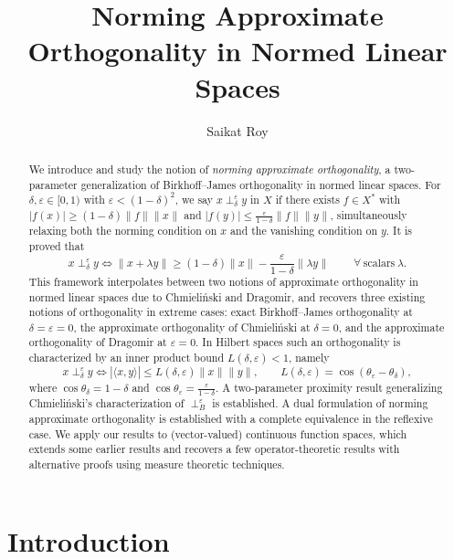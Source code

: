 \documentclass[11pt, reqno]{amsart}
\title[Norming Approximate Orthogonality]
{Norming Approximate Orthogonality in Normed Linear Spaces}
\author{Saikat Roy}
\theoremstyle{definition}
\newcommand{\nperp}{\perp_{\delta}^\varepsilon}
\begin{document}
\begin{abstract}
We introduce and study the notion of \emph{norming approximate orthogonality}, a two-parameter generalization of Birkhoff--James orthogonality in normed linear spaces. For 
$\delta, \varepsilon \in [0,1)$ with $\varepsilon < (1-\delta)^2$, we say 
$x \nperp y$ in $X$ if there exists $f \in X^*$ with 
$|f(x)| \geq (1-\delta)\|f\|\|x\|$ and $|f(y)| \leq \frac{\varepsilon}{1-\delta}\|f\|\|y\|$, 
simultaneously relaxing both the norming condition on $x$ and the vanishing 
condition on $y$. It is proved that
\[
x\nperp y \iff \|x+\lambda y\|\geq (1-\delta)\|x\|-\frac{\varepsilon}{1-\delta}\|\lambda y\|~\qquad \forall ~\text{scalars}~\lambda.
\]
This framework interpolates between two notions of approximate orthogonality in normed linear spaces due to Chmieli\'nski and Dragomir, and recovers three existing notions of orthogonality in extreme cases: exact Birkhoff--James orthogonality at $\delta = \varepsilon = 0$, the approximate 
orthogonality of Chmieli\'nski at $\delta = 0$, and the approximate orthogonality 
of Dragomir at $\varepsilon = 0$. In Hilbert spaces such an orthogonality is characterized by an inner product bound $L(\delta,\varepsilon)<1$, namely
\[
x\nperp y \iff |\langle x, y \rangle| \leq L(\delta,\varepsilon)\|x\|\|y\|,
\qquad L(\delta,\varepsilon)=\cos(\theta_\varepsilon-\theta_\delta),
\]
where $\cos\theta_\delta = 1-\delta$ and
$\cos\theta_\varepsilon = \frac{\varepsilon}{1-\delta}$.
A two-parameter proximity result generalizing Chmieli\'nski's characterization of $\perp_B^\varepsilon$ is established. A dual formulation of norming approximate orthogonality is established with a complete equivalence in the reflexive case. We apply our results to (vector-valued) continuous function spaces, which extends some earlier results and recovers  a few operator-theoretic results with alternative proofs using measure theoretic techniques.
\end{abstract}



\maketitle

{\small \tableofcontents}


\bigskip

\section{Introduction}
\end{document}
